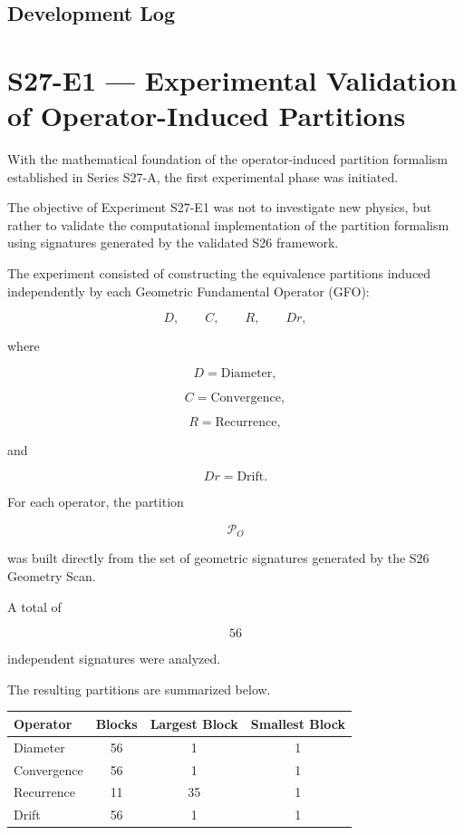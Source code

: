 \subsection*{Development Log}

\section{S27-E1 --- Experimental Validation of Operator-Induced Partitions}

With the mathematical foundation of the operator-induced partition formalism established in Series S27-A, the first experimental phase was initiated.

The objective of Experiment S27-E1 was not to investigate new physics, but rather to validate the computational implementation of the partition formalism using signatures generated by the validated S26 framework.

The experiment consisted of constructing the equivalence partitions induced independently by each Geometric Fundamental Operator (GFO):

\[
D,\qquad
C,\qquad
R,\qquad
Dr,
\]

where

\[
D=\text{Diameter},
\]

\[
C=\text{Convergence},
\]

\[
R=\text{Recurrence},
\]

and

\[
Dr=\text{Drift}.
\]

For each operator, the partition

\[
\mathcal P_O
\]

was built directly from the set of geometric signatures generated by the S26 Geometry Scan.

A total of

\[
56
\]

independent signatures were analyzed.

The resulting partitions are summarized below.

\begin{center}
\begin{tabular}{lccc}
\hline
Operator & Blocks & Largest Block & Smallest Block\\
\hline
Diameter      & 56 & 1 & 1\\
Convergence   & 56 & 1 & 1\\
Recurrence    & 11 & 35 & 1\\
Drift         & 56 & 1 & 1\\
\hline
\end{tabular}
\end{center}

